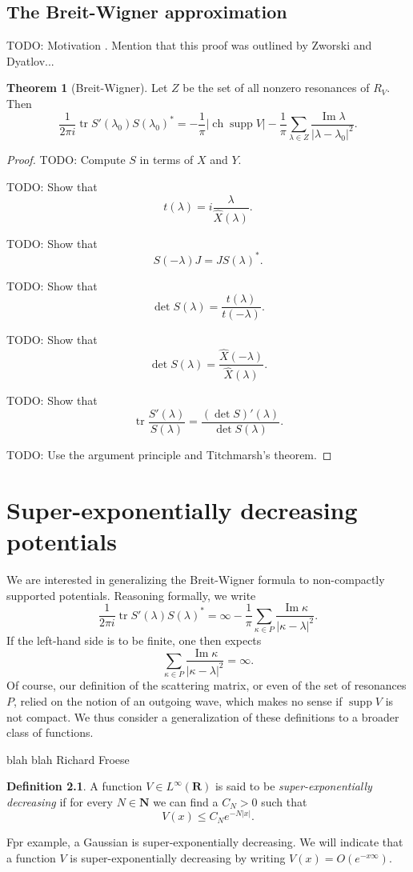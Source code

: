 \documentclass[12pt]{report}
\newcommand{\NN}{\mathbf{N}}
\newcommand{\RR}{\mathbf{R}}
\DeclareMathOperator{\ch}{ch}
\DeclareMathOperator{\supp}{supp}
\newcommand{\dfn}[1]{\emph{#1}\index{#1}}
\renewcommand{\Im}{\operatorname{Im}}
\newcommand{\tr}{\operatorname{tr}}
\theoremstyle{definition}
\newtheorem{theorem}{Theorem}[chapter]
\newtheorem{definition}[theorem]{Definition}
\begin{document}
\section{The Breit-Wigner approximation}
TODO: Motivation . Mention that this proof was outlined by Zworski and Dyatlov...

\begin{theorem}[Breit-Wigner]
Let $Z$ be the set of all nonzero resonances of $R_V$. Then
$$\frac{1}{2\pi i} \tr S'(\lambda_0)S(\lambda_0)^* = -\frac{1}{\pi}|\ch\supp V| - \frac{1}{\pi}\sum_{\lambda \in Z} \frac{\Im \lambda}{|\lambda - \lambda_0|^2}.$$
\end{theorem}
\begin{proof}
  TODO: Compute $S$ in terms of $X$ and $Y$.

  TODO: Show that
  $$t(\lambda) = i\frac{\lambda}{\hat X(\lambda)}.$$

  TODO: Show that
  $$S(-\lambda)J = JS(\lambda)^*.$$

  TODO: Show that
  $$\det S(\lambda) = \frac{t(\lambda)}{t(-\lambda)}.$$

  TODO: Show that
  $$\det S(\lambda) = \frac{\hat X(-\lambda)}{\hat X(\lambda)}.$$

  TODO: Show that
  $$\tr \frac{S'(\lambda)}{S(\lambda)} = \frac{(\det S)'(\lambda)}{\det S(\lambda)}.$$

  TODO: Use the argument principle and Titchmarsh's theorem.
\end{proof}



\chapter{Super-exponentially decreasing potentials}
We are interested in generalizing the Breit-Wigner formula to non-compactly supported potentials. Reasoning formally, we write
$$\frac{1}{2\pi i}\tr S'(\lambda)S(\lambda)^* = \infty - \frac{1}{\pi} \sum_{\kappa \in P} \frac{\Im \kappa}{|\kappa - \lambda|^2}.$$
If the left-hand side is to be finite, one then expects
$$\sum_{\kappa \in P} \frac{\Im \kappa}{|\kappa - \lambda|^2} = \infty.$$
Of course, our definition of the scattering matrix, or even of the set of resonances $P$, relied on the notion of an outgoing wave, which makes no sense if $\supp V$ is not compact. We thus consider a generalization of these definitions to a broader class of functions.

blah blah Richard Froese
\begin{definition}
A function $V \in L^\infty(\RR)$ is said to be \dfn{super-exponentially decreasing} if for every $N \in \NN$ we can find a $C_N > 0$ such that
$$V(x) \leq C_Ne^{-N|x|}.$$
\end{definition}
Fpr example, a Gaussian is super-exponentially decreasing. We will indicate that a function $V$ is super-exponentially decreasing by writing $V(x) = O(e^{-x\infty})$.
\end{document}
